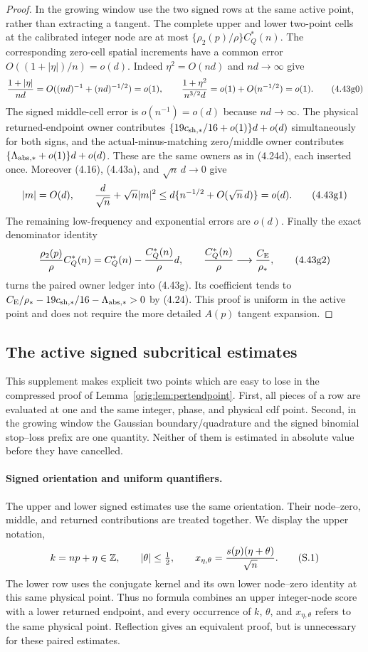 \documentclass[11pt,a4paper]{article}
\numberwithin{equation}{section}
\theoremstyle{definition}
\theoremstyle{remark}
\newcommand{\CE}{C_{\mathrm E}}
\begin{document}
\begin{proof}
In the growing window use the two signed rows at the same active point,
rather than extracting a tangent.  The complete upper and lower
two-point cells at the calibrated integer node are at most
$\{\rho_2(p)/\rho\}C_Q^*(n)$.  The corresponding zero-cell spatial
increments have a common error
$O((1+|\eta|)/n)=o(d)$.  Indeed $\eta^2=O(nd)$ and $nd\to\infty$ give
\[
 {1+|\eta|\over nd}=O((nd)^{-1}+(nd)^{-1/2})=o(1),
 \qquad
 {1+\eta^2\over n^{3/2}d}=o(1)+O(n^{-1/2})=o(1).      \tag{4.43g0}
\]
The signed middle-cell error is $o(n^{-1})=o(d)$ because $nd\to\infty$.
The physical returned-endpoint owner contributes
$\{19c_{\rm sh,*}/16+o(1)\}d+o(d)$ simultaneously for both signs, and
the actual-minus-matching zero/middle owner contributes
$\{\Lambda_{\rm abs,*}+o(1)\}d+o(d)$.  These are the same owners as in
(4.24d), each inserted once.  Moreover (4.16), (4.43a), and
$\sqrt n\,d\to0$ give
\[
 |m|=O(d),\qquad
 {d\over\sqrt n}+\sqrt n|m|^2
 \le d\{n^{-1/2}+O(\sqrt n\,d)\}=o(d).               \tag{4.43g1}
\]
The remaining low-frequency and exponential errors are $o(d)$.  Finally
the exact denominator identity
\[
 {\rho_2(p)\over\rho}C_Q^*(n)
 =C_Q^*(n)-{C_Q^*(n)\over\rho}d,\qquad
 {C_Q^*(n)\over\rho}\longrightarrow {\CE\over\rho_*}, \tag{4.43g2}
\]
turns the paired owner ledger into (4.43g).  Its coefficient tends to
$\CE/\rho_*-19c_{\rm sh,*}/16-\Lambda_{\rm abs,*}>0$ by (4.24).
This proof is uniform in the active point and does not require the
more detailed $A(p)$ tangent expansion.
\end{proof}

\subsection*{The active signed subcritical estimates}

This supplement makes explicit two points which are easy to lose in the
compressed proof of Lemma~\ref{orig:lem:pertendpoint}.  First, all pieces of a
row are evaluated at one and the same integer, phase, and physical cdf
point.  Second, in the growing window the Gaussian boundary/quadrature and
the signed binomial stop--loss prefix are one quantity.  Neither of them is
estimated in absolute value before they have cancelled.

\paragraph{Signed orientation and uniform quantifiers.}
The upper and lower signed estimates use the same orientation. Their
node--zero, middle, and returned contributions are treated together.
We display the upper notation,
\[
 k=np+\eta\in\mathbb Z,\qquad |\theta|\le\tfrac12,
 \qquad x_{\eta,\theta}={s(p)(\eta+\theta)\over\sqrt n}.       \tag{S.1}
\]
The lower row uses the conjugate kernel and its own lower node--zero
identity at this same physical point.  Thus no formula combines an upper
integer-node score with a lower returned endpoint, and every occurrence of
\(k\), \(\theta\), and \(x_{\eta,\theta}\) refers to the same physical
point. Reflection gives an equivalent proof, but is unnecessary for
these paired estimates.
\end{document}
